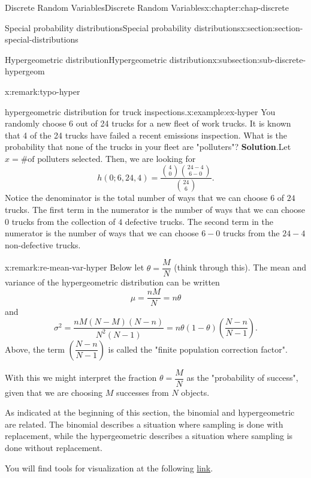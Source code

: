 \documentclass[oneside,10pt,]{book}
\newcommand{\blocktitlefont}{\relax}
\begin{document}
\begin{chapterptx}{Discrete Random Variables}{}{Discrete Random Variables}{}{}{x:chapter:chap-discrete}
\begin{sectionptx}{Special probability distributions}{}{Special probability distributions}{}{}{x:section:section-special-distributions}
\begin{subsectionptx}{Hypergeometric distribution}{}{Hypergeometric distribution}{}{}{x:subsection:sub-discrete-hypergeom}
\begin{remark}{}{x:remark:typo-hyper}
\end{remark}
\begin{example}{hypergeometric distribution for truck inspections.}{x:example:ex-hyper}%
You randomly choose 6 out of 24 trucks for a new fleet of work trucks.  It is known that 4 of the 24 trucks have failed a recent emissions inspection. What is the probability that none of the trucks in your fleet are "polluters"?%
\textbf{\blocktitlefont Solution}.\quad{}Let \(x = \text{\# of polluters selected}\).  Then, we are looking for%
\begin{equation*}
h(0; 6, 24, 4) = \dfrac{{4 \choose 0}{24-4 \choose{6-0}}}{{24 \choose
6}}\text{.}
\end{equation*}
Notice the denominator is the total number of ways that we can choose \(6\) of \(24\) trucks.  The first term in the numerator is the number of ways that we can choose \(0\) trucks from the collection of \(4\) defective trucks.   The second term in the numerator is the number of ways that we can choose \(6-0\) trucks from the \(24-4\) non-defective trucks.%
\end{example}
\begin{remark}{}{x:remark:re-mean-var-hyper}%
Below let \(\theta = \dfrac{M}{N}\) (think through this). The mean and variance of the hypergeometric distribution can be written%
\begin{equation*}
\mu =
\frac{nM}{N} = n\theta
\end{equation*}
and%
\begin{equation*}
\sigma^2 =
\frac{nM(N-M)(N-n)}{N^2(N-1)} =
n\theta(1-\theta)\left(\dfrac{N-n}{N-1}\right)\text{.}
\end{equation*}
Above, the term \(\left(\dfrac{N-n}{N-1}\right)\) is called the "finite population correction factor".%
\par
With this we might interpret the fraction \(\theta = \dfrac{M}{N}\) as the "probability of success", given that we are choosing \(M\) successes from \(N\) objects.%
\end{remark}
As indicated at the beginning of this section, the binomial and hypergeometric are related. The binomial describes a situation where sampling is done with replacement, while the hypergeometric describes a situation where sampling is done without replacement.%
\par
You will find tools for visualization at the following \href{https://buddy.uco.edu/shiny/slaverty/mathstat/HyperBin/}{link}.%
\end{subsectionptx}
%
%
\typeout{************************************************}

\end{sectionptx}
\end{chapterptx}
\end{document}
